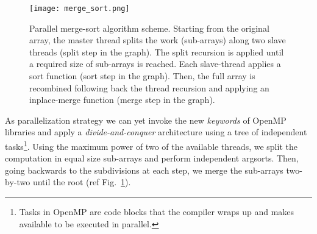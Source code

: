 \documentclass{standalone}
\begin{document}
\begin{figure}[htbp]
\centering
\texttt{[image: merge\_sort.png]}
\caption{Parallel merge-sort algorithm scheme.
Starting from the original array, the master thread splits the work (sub-arrays) along two slave threads (\textsf{split} step in the graph).
The split recursion is applied until a required size of sub-arrays is reached.
Each slave-thread applies a sort function (\textsf{sort} step in the graph).
Then, the full array is recombined following back the thread recursion and applying an \textsf{inplace-merge} function (\textsf{merge} step in the graph).
}
\label{fig:merge_sort}
\end{figure}

As parallelization strategy we can yet invoke the new \emph{keywords} of OpenMP libraries and apply a \emph{divide-and-conquer} architecture using a tree of independent \textsf{tasks}\footnote{
  Tasks in OpenMP are code blocks that the compiler wraps up and makes available to be executed in parallel.
}.
Using the maximum power of two of the available threads, we split the computation in equal size sub-arrays and perform independent \textsf{argsort}s.
Then, going backwards to the subdivisions at each step, we merge the sub-arrays two-by-two until the root (ref Fig.~\ref{fig:merge_sort}).
\end{document}
